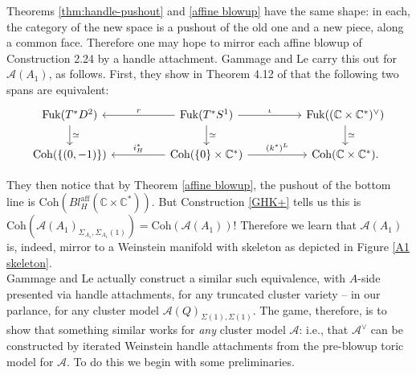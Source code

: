 \documentclass[11pt]{amsart}
\newtheorem{prop}[thm]{Proposition}
\theoremstyle{definition}
\theoremstyle{remark}
\newcommand{\A}{\mathcal{A}}
\newcommand{\X}{\mathcal{X}}
\newcommand{\Coh}{\mathrm{Coh}}
\newcommand{\Fuk}{\mathrm{Fuk}}
\numberwithin{equation}{section}
\begin{document}
Theorems \ref{thm:handle-pushout} and \ref{affine blowup} have the same shape: in each, the category of the new space is a pushout of the old one and a new piece, along a common face. Therefore one may hope to mirror each affine blowup of Construction 2.24 by a handle attachment. Gammage and Le carry this out for $\mathcal A(A_1)$, as follows. First, they show in Theorem 4.12 of \cite{GL} that the following two spans are equivalent: $$\begin{tikzcd}
\Fuk(T^* D^2) \arrow[d, "\simeq"] &  & \Fuk(T^*S^1) \arrow[ll, "r"'] \arrow[rr, "\iota"] \arrow[d, "\simeq"]               &  & \Fuk((\mathbb{C} \times \mathbb{C}^*)^\vee) \arrow[d, "\simeq"] \\
{\Coh(\{(0, -1)\})}               &  & \Coh(\{0\} \times \mathbb{C}^*) \arrow[rr, "(k^*)^L"] \arrow[ll, "i^*_H"'] &  & \Coh(\mathbb{C} \times \mathbb{C}^*).                          
\end{tikzcd}$$

They then notice that by Theorem \ref{affine blowup}, the pushout of the bottom line is $\Coh(Bl_H^{\text{aff}}(\mathbb{C} \times \mathbb{C}^*))$. But Construction \ref{GHK+} tells us this is $\Coh(\mathcal{A}(A_1)_{\Sigma_{A_1}, \Sigma_{A_1}(1)}) = \Coh(\mathcal{A}(A_1))$! Therefore we learn that $\mathcal{A}(A_1)$ is, indeed, mirror to a Weinstein manifold with skeleton as depicted in Figure \ref{A1 skeleton}.\\

Gammage and Le actually construct a similar such equivalence, with $A$-side presented via handle attachments, for any truncated cluster variety -- in our parlance, for any cluster model $\mathcal{A}(Q)_{\Sigma(1), \Sigma(1)}$. The game, therefore, is to show that something similar works for \textit{any} cluster model $\A$: i.e., that $\A^\vee$ can be constructed by iterated Weinstein handle attachments from the pre-blowup toric model for $\A$. To do this we begin with some preliminaries.

\end{document}
